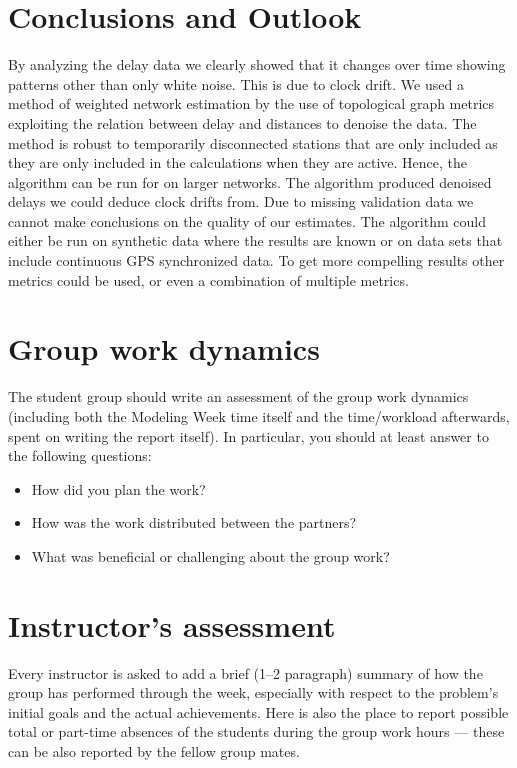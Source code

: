 \documentclass[12pt, sumlimits, intlimits]{article}
\begin{document}
\section{Conclusions and Outlook}
By analyzing the delay data we clearly showed that it changes over time showing patterns other than only white noise. This is due to clock drift. We used a method of weighted network estimation by the use of
topological graph metrics exploiting the relation between delay and distances to denoise the data. The method is robust to temporarily disconnected stations that are only included as they are only included in the calculations when they are active. Hence, the algorithm can be run for on larger networks. The algorithm produced denoised delays we could deduce clock drifts from. Due to missing validation data we cannot make conclusions on the quality of our estimates. The algorithm could either be run on synthetic data where the results are known or on data sets that include continuous GPS synchronized data. To get more compelling results other metrics could be used, or even a combination of multiple metrics.


\section{Group work dynamics}

The student group should write an assessment of the group work dynamics
(including both the Modeling Week time itself and the time/workload afterwards,
spent on writing the report itself). In particular, you should at least answer
to the following questions:
\begin{itemize}
\item How did you plan the work?
\item How was the work distributed between the partners?
\item What was beneficial or challenging about the group work?
\end{itemize}

\section{Instructor's assessment}

Every instructor is asked to add a brief (1--2 paragraph) summary of how the
group has performed through the week, especially with respect to the problem's
initial goals and the actual achievements. Here is also the place to report
possible total or part-time absences of the students during the group work
hours --- these can be also reported by the fellow group mates.

\clearpage

\thispagestyle{empty}


\printbibliography
%  
%   
\end{document}
